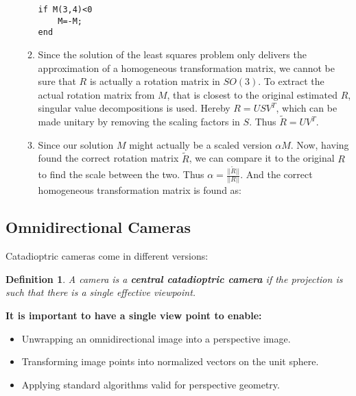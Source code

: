\documentclass[10pt,a4paper]{scrartcl}
\newtheorem{define}{Definition}
\begin{document}
\begin{multicols*}{2}
\begin{itemize}
\begin{enumerate}
\begin{verbatim}
if M(3,4)<0
    M=-M; 
end
\end{verbatim}
\item Since the solution of the least squares problem only delivers the approximation of a homogeneous transformation matrix, we cannot be sure that $R$ is actually a rotation matrix in $SO(3)$. To extract the actual rotation matrix from $M$, that is closest to the original estimated $R$, singular value decompositions is used. Hereby $R=USV^T$, which can be made unitary by removing the scaling factors in $S$. Thus $\tilde{R}=UV^T$.

\item Since our solution $M$ might actually be a scaled version $\alpha M$. Now, having found the correct rotation matrix $\tilde{R}$, we can compare it to the original $R$ to find the scale between the two. Thus $\alpha = \frac{||\tilde{R}||}{||R||}$. And the correct homogeneous transformation matrix is found as:

\end{enumerate}
\end{itemize}

\subsection{Omnidirectional Cameras}


Catadioptric cameras come in different versions:

\begin{minipage}{0.45\linewidth}
\end{minipage}
\hfill
\begin{minipage}{0.45\linewidth}
\end{minipage}

\begin{define}
A camera is a \textbf{central catadioptric camera} if the projection is such that there is a single effective viewpoint.
\end{define}

\textbf{It is important to have a single view point to enable:}

\begin{itemize}
\item Unwrapping an omnidirectional image into a perspective image.
\item Transforming image points into normalized vectors on the unit sphere.
\item Applying standard algorithms valid for perspective geometry.
\end{itemize}


\end{multicols*}
\end{document}
